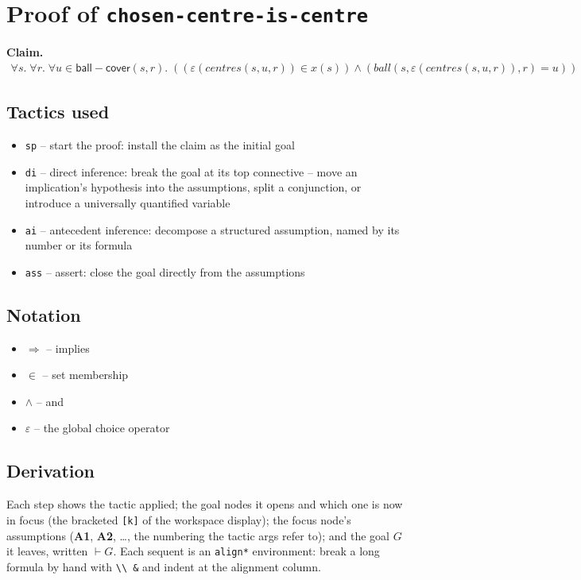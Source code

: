 \documentclass[11pt]{article}
\begin{document}
\section*{Proof of \texttt{chosen-centre-is-centre}}
\textbf{Claim.}
\begin{align*}
  \forall s.\; \forall r.\; \forall u \in \mathsf{ball{-}cover}(s, r).\; ((\varepsilon(\mathit{centres}(s, u, r)) \in x(s)) \wedge (\mathit{ball}(s, \varepsilon(\mathit{centres}(s, u, r)), r) = u))
\end{align*}
\bigskip

\subsection*{Tactics used}
\begin{itemize}
\item \texttt{sp} -- start the proof: install the claim as the initial goal
\item \texttt{di} -- direct inference: break the goal at its top connective -- move an implication's hypothesis into the assumptions, split a conjunction, or introduce a universally quantified variable
\item \texttt{ai} -- antecedent inference: decompose a structured assumption, named by its number or its formula
\item \texttt{ass} -- assert: close the goal directly from the assumptions
\end{itemize}

\subsection*{Notation}
\begin{itemize}
\item $\Rightarrow$ -- implies
\item $\in$ -- set membership
\item $\wedge$ -- and
\item $\varepsilon$ -- the global choice operator
\end{itemize}

\subsection*{Derivation}
Each step shows the tactic applied; the goal nodes it opens and which one is now in focus (the bracketed \texttt{[k]} of the workspace display); the focus node's assumptions (\textbf{A1}, \textbf{A2}, \dots{}, the numbering the tactic args refer to); and the goal $G$ it leaves, written $\vdash G$.  Each sequent is an \texttt{align*} environment: break a long formula by hand with \texttt{\textbackslash\textbackslash\ \&} and indent at the alignment column.
\end{document}
